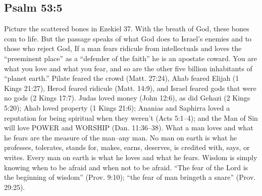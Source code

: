 \subsection{Psalm 53:5}
Picture the scattered bones in Ezekiel 37. With the breath of God, these bones com to life. But the passage speaks of what God does to Israel's enemies and to those who reject God, If a man fears ridicule from intellectuals and loves the ``preeminent place'' as a ``defender of the faith'' he is an apostate coward. You are what you love and what you fear, and so are the other five billion inhabitants of ``planet earth.'' Pilate feared the crowd (Matt. 27:24), Ahab feared Elijah (1 Kings 21:27), Herod feared ridicule (Matt. 14:9), and Israel feared gods that were no gods (2 Kings 17:7). Judas loved money (John 12:6), as did Gehazi (2 Kings 5:20); Ahab loved property (1 Kings 21:6); Ananias and Saphirra loved a reputation for being spiritual when they weren’t (Acts 5:1--4); and the Man of Sin will love POWER and WORSHIP (Dan. 11:36--38). What a man loves and what he fears are the measure of the man--any man. No man on earth is what he professes, tolerates, stands for, makes, earns, deserves, is credited with, says, or writes. Every man on earth is what he loves and what he fears. Wisdom is simply knowing when to be afraid and when not to be afraid. ``The fear of the Lord is the beginning of wisdom'' (Prov. 9:10); ``the fear of man bringeth a snare'' (Prov. 29:25). \cite{Ruckman1992PsalmsV1}
